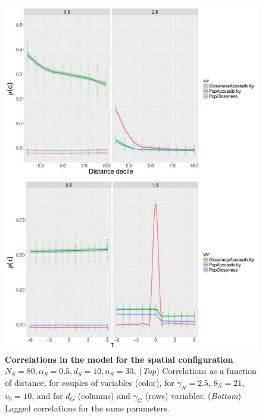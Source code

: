 \begin{figure}
\includegraphics[width=\linewidth,height=0.9\textheight]{figures/6-1-3-fig-macrocoevolexplo-correlations.jpg}
	\caption{\textbf{Correlations in the model for the spatial configuration $N_S=80,\alpha_S=0.5,d_S=10,n_S=30$.} (\textit{Top}) Correlations as a function of distance, for couples of variables (color), for $\gamma_N = 2.5$, $\theta_N = 21$, $v_0 = 10$, and for $d_G$ (columns) and $\gamma_G$ (rows) variables; (\textit{Bottom}) Lagged correlations for the same parameters. \label{fig:macrocoevolexplo:correlations}}
\end{figure}


